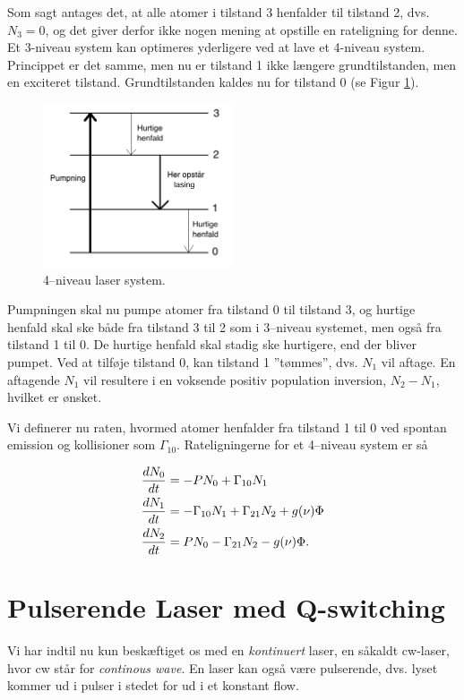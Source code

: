 Som sagt antages det, at alle atomer i tilstand 3 henfalder til tilstand 2, dvs. $N_3=0$, og det giver derfor ikke nogen mening at opstille en rateligning for denne. \\

Et 3-niveau system kan optimeres yderligere ved at lave et 4-niveau system. 
Princippet er det samme, men nu er tilstand 1 ikke længere grundtilstanden, men en exciteret tilstand. Grundtilstanden kaldes nu for tilstand 0 (se Figur \ref{fig:4niveau}). 

\begin{figure}[h!]
  \centering
  \includegraphics[width=0.5\textwidth]{Laserfysik/4niveau.png}
  \caption{4--niveau laser system.}
  \label{fig:4niveau}
\end{figure}

Pumpningen skal nu pumpe atomer fra tilstand 0 til tilstand 3, og hurtige henfald skal ske både fra tilstand 3 til 2 som i 3--niveau systemet, men også fra tilstand 1 til 0. De hurtige henfald skal stadig ske hurtigere, end der bliver pumpet. Ved at tilføje tilstand 0, kan tilstand 1 ''tømmes'', dvs. $N_1$ vil aftage. En aftagende $N_1$ vil resultere i en voksende positiv population inversion, $N_2-N_1$, hvilket er ønsket. 

Vi definerer nu raten, hvormed atomer henfalder fra tilstand 1 til 0 ved spontan emission og kollisioner som $\Gamma_{10}$. Rateligningerne for et 4--niveau system er så 

\begin{align}
{d{N_0} \over d{t}} &= -PN_0 + \Gamma_{10}N_1\\
{d{N_1} \over d{t}} &= -\Gamma_{10}N_1+\Gamma_{21}N_2 + g(\nu)\Phi\\
{d{N_2} \over d{t}} &= PN_0 - \Gamma_{21}N_2 - g(\nu)\Phi.
\end{align}


\section{Pulserende Laser med Q-switching}
Vi har indtil nu kun beskæftiget os med en \emph{kontinuert} laser, en såkaldt cw-laser, hvor cw står for \emph{continous wave}. 
En laser kan også være pulserende, dvs. lyset kommer ud i pulser i stedet for ud i et konstant flow. 

